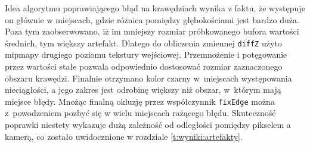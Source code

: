 	Idea algorytmu poprawiającego błąd na krawędziach wynika z faktu, że występuje on głównie w miejscach, gdzie różnica pomiędzy głębokościami jest bardzo duża. Poza tym zaobserwowano, iż im mniejszy rozmiar próbkowanego bufora wartości średnich, tym większy artefakt. Dlatego do obliczenia zmiennej \texttt{diffZ} użyto mipmapy drugiego poziomu tekstury wejściowej. Przemnożenie i potęgowanie przez wartości stałe pozwala odpowiednio dostosować rozmiar zaznaczonego obszaru krawędzi. Finalnie otrzymano kolor czarny w~miejscach występowania nieciągłości, a jego zakres jest odrobinę większy niż obszar, w~którym mają miejsce błędy. Mnożąc finalną okluzję przez współczynnik \texttt{fixEdge} można z~powodzeniem pozbyć się w wielu miejscach rażącego błędu. Skuteczność poprawki niestety wykazuje dużą zależność od odległości pomiędzy pikselem a kamerą, co zostało uwidocznione w rozdziale \ref{t:wyniki:artefakty}.